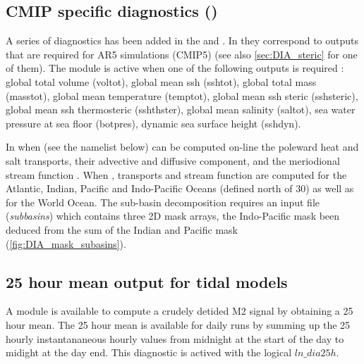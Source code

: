 \documentclass[../main/NEMO_manual]{subfiles}
\begin{document}
\subsection[CMIP specific diagnostics (\textit{diaar5.F90}, \textit{diaptr.F90})]{CMIP specific diagnostics (\protect{})}

A series of diagnostics has been added in the  and .
In  they correspond to outputs that are required for AR5 simulations (CMIP5)
(see also \autoref{sec:DIA_steric} for one of them).
The module  is active when one of the following outputs is required :
global total volume (voltot), global mean ssh (sshtot), global total mass (masstot), global mean temperature (temptot),
global mean ssh steric (sshsteric), global mean ssh thermosteric (sshthster), global mean salinity (saltot),
sea water pressure at sea floor (botpres), dynamic sea surface height (sshdyn).

In  when 
(see the  namelist below) can be computed on-line the poleward heat and salt transports,
their advective and diffusive component, and the meriodional stream function .
When , transports and stream function are computed for the Atlantic, Indian,
Pacific and Indo-Pacific Oceans (defined north of 30) as well as for the World Ocean.
The sub-basin decomposition requires an input file (\textit{subbasins}) which contains three 2D mask arrays,
the Indo-Pacific mask been deduced from the sum of the Indian and Pacific mask (\autoref{fig:DIA_mask_subasins}).

\begin{listing}
  \caption{}
  \label{lst:namptr}
\end{listing}

\subsection{25 hour mean output for tidal models}

\begin{listing}
  \caption{}
  \label{lst:nam_dia25h}
\end{listing}

A module is available to compute a crudely detided M2 signal by obtaining a 25 hour mean.
The 25 hour mean is available for daily runs by summing up the 25 hourly instantananeous hourly values from
midnight at the start of the day to midight at the day end.
This diagnostic is actived with the logical $ln\_dia25h$.
\end{document}
